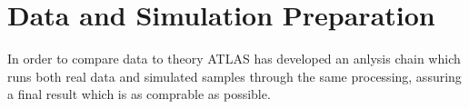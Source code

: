 \chapter{Data and Simulation Preparation} \label{chap:data}

In order to compare data to theory ATLAS has developed an anlysis chain which
runs both real data and simulated samples through the same processing, assuring
a final result which is as comprable as possible.



